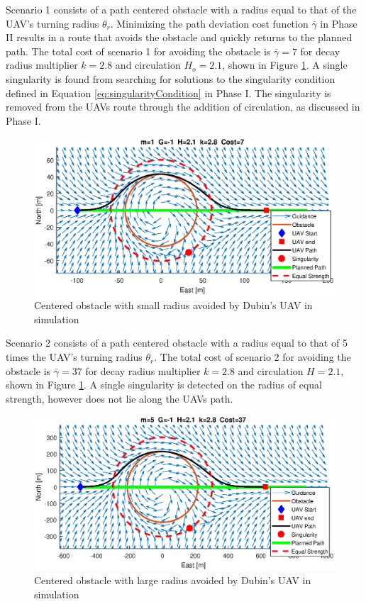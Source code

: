 \documentclass[numbered,pdftex]{ohio-etd}
\begin{document}
Scenario 1 consists of a path centered obstacle with a radius equal to that of the UAV's turning radius $\theta_r$. Minimizing the path deviation cost function  $\bar{\gamma}$ in Phase II results in a route that avoids the obstacle and quickly returns to the planned path. The total cost of scenario 1 for avoiding the obstacle is $\bar{\gamma}=7$ for decay radius multiplier $k=2.8$ and circulation $H_o = 2.1$, shown in Figure \ref{fig:m1y0solved}. A single singularity is found from searching for solutions to the singularity condition defined in Equation \ref{eq:singularityCondition} in Phase I. The singularity is removed from the UAVs route through the addition of circulation, as discussed in Phase I.

\begin{figure}[H]
	\centering
	\includegraphics[trim = 0 85 0 85, clip, width=16cm]{Figures/results/m1Y0Solved}
	\caption{Centered obstacle with small radius avoided by Dubin's UAV in simulation}
	\label{fig:m1y0solved}
\end{figure}

Scenario 2 consists of a path centered obstacle with a radius equal to that of 5 times the UAV's turning radius $\theta_r$. The total cost of scenario 2 for avoiding the obstacle is $\bar{\gamma}=37$ for decay radius multiplier $k=2.8$ and circulation $H = 2.1$, shown in Figure \ref{fig:m1y0solved}. A single singularity is detected on the radius of equal strength, however does not lie along the UAVs path.


\begin{figure}[H]
	\centering
	\includegraphics[trim = 0 85 0 85, clip, width=16cm]{Figures/results/m5Y0Solved}
	\caption{Centered obstacle with large radius avoided by Dubin's UAV in simulation}
	\label{fig:m5y0solved}
\end{figure}
\end{document}
